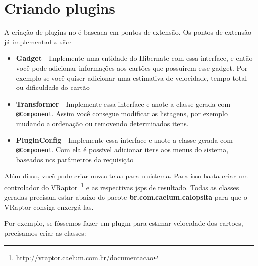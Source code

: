 \section{Criando plugins}
\label{app:plugins}
A criação de plugins no \calopsita{} é baseada em pontos de extensão. Os pontos de extensão já implementados são:

\begin{itemize}
	\item{\textbf{Gadget} - Implemente uma entidade do Hibernate com essa interface, e então você pode adicionar informações aos cartões que possuirem esse gadget. Por exemplo se você quiser adicionar uma estimativa de velocidade, tempo total ou dificuldade do cartão}
	\item{\textbf{Transformer} - Implemente essa interface e anote a classe gerada com \texttt{@Component}. Assim você consegue modificar as listagens, por exemplo mudando a ordenação ou removendo determinados itens.}
	\item{\textbf{PluginConfig} - Implemente essa interface e anote a classe gerada com \texttt{@Component}. Com ela é possível adicionar itens aos menus do sistema, baseados nos parâmetros da requisição}
\end{itemize}

Além disso, você pode criar novas telas para o sistema. Para isso basta criar um controlador do 
VRaptor~\footnote{http://vraptor.caelum.com.br/documentacao} e as respectivas jsps de resultado.
Todas as classes geradas precisam estar abaixo do pacote \textbf{br.com.caelum.calopsita} para que o VRaptor consiga enxergá-las.

Por exemplo, se fôssemos fazer um plugin para estimar velocidade dos cartões, precisamos criar as classes:

